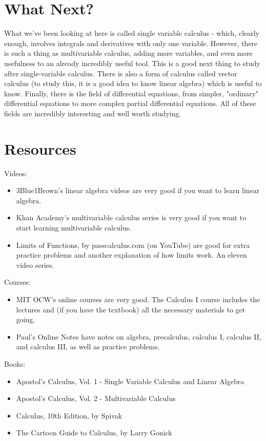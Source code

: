 \documentclass[12pt]{article}
\begin{document}
\section{What Next?}

What we've been looking at here is called single variable calculus -
which, clearly enough, involves integrals and derivatives with only
one variable. However, there is such a thing as multivariable
calculus, adding more variables, and even more usefulness to an
already incredibly useful tool. This is a good next thing to study
after single-variable calculus. There is also a form of calculus
called vector calculus (to study this, it is a good idea to know
linear algebra) which is useful to know. Finally, there is the field
of differential equations, from simpler, "ordinary" differential
equations to more complex partial differential equations. All of these
fields are incredibly interesting and well worth studying.

\section{Resources}

Videos:
\begin{itemize}
\item 3Blue1Brown's linear algebra videos are very good if you want to learn linear algebra.
\item Khan Academy's multivariable calculus series is very good if you want to start learning multivariable calculus.
\item Limits of Functions, by passcalculus.com (on YouTube) are good for extra practice problems and another explanation of how limits work. An eleven video series.
\end{itemize}

Courses:
\begin{itemize}
\item MIT OCW's online courses are very good. The Calculus I course includes the lectures and (if you have the textbook) all the necessary materials to get going.
\item Paul's Online Notes have notes on algebra, precalculus, calculus I, calculus II, and calculus III, as well as practice problems.
\end{itemize}

Books:
\begin{itemize}
\item Apostol's Calculus, Vol. 1 - Single Variable Calculus and Linear Algebra
\item Apostol's Calculus, Vol. 2 - Multivariable Calculus
\item Calculus, 10th Edition, by Spivak
\item The Cartoon Guide to Calculus, by Larry Gonick
\end{itemize}
\end{document}

